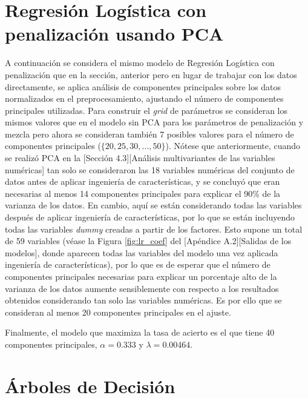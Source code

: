 \documentclass[12pt,a4paper,]{book}
\newcounter{dummy}
\numberwithin{dummy}{section}
\theoremstyle{ocrenumbox}
\theoremstyle{blacknumex}
\theoremstyle{blacknumbox}
\theoremstyle{ocrenum}
\theoremstyle{ocrenum}
\begin{document}
\hypertarget{regresiuxf3n-loguxedstica-con-penalizaciuxf3n-usando-pca}{%
\section{Regresión Logística con penalización usando
PCA}\label{regresiuxf3n-loguxedstica-con-penalizaciuxf3n-usando-pca}}

A continuación se considera el mismo modelo de Regresión Logística con
penalización que en la sección, anterior pero en lugar de trabajar con
los datos directamente, se aplica análisis de componentes principales
sobre los datos normalizados en el preprocesamiento, ajustando el número
de componentes principales utilizadas. Para construir el \emph{grid} de
parámetros se consideran los mismos valores que en el modelo sin PCA
para los parámetros de penalización y mezcla pero ahora se consideran
también 7 posibles valores para el número de componentes principales
(\(\{20,25,30,...,50\}\)). Nótese que anteriormente, cuando se realizó
PCA en la {[}Sección 4.3{]}{[}Análisis multivariantes de las variables
numéricas{]} tan solo se consideraron las 18 variables numéricas del
conjunto de datos antes de aplicar ingeniería de características, y se
concluyó que eran necesarias al menos 14 componentes principales para
explicar el 90\% de la varianza de los datos. En cambio, aquí se están
considerando todas las variables después de aplicar ingeniería de
características, por lo que se están incluyendo todas las variables
\emph{dummy} creadas a partir de los factores. Esto supone un total de
59 variables (véase la Figura \ref{fig:lr_coef} del {[}Apéndice
A.2{]}{[}Salidas de los modelos{]}, donde aparecen todas las variables
del modelo una vez aplicada ingeniería de características), por lo que
es de esperar que el número de componentes principales necesarias para
explicar un porcentaje alto de la varianza de los datos aumente
sensiblemente con respecto a los resultados obtenidos considerando tan
solo las variables numéricas. Es por ello que se consideran al menos 20
componentes principales en el ajuste.

Finalmente, el modelo que maximiza la tasa de acierto es el que tiene 40
componentes principales, \(\alpha= 0.333\) y \(\lambda = 0.00464\).

\hypertarget{uxe1rboles-de-decisiuxf3n}{%
\section{Árboles de Decisión}\label{uxe1rboles-de-decisiuxf3n}}
\end{document}
